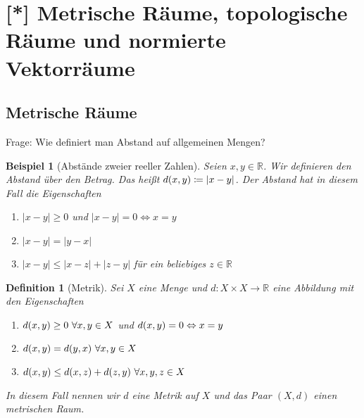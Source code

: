 \documentclass[11pt, twoside, a4paper]{article}
\theoremstyle{plain}
\newtheorem{definition}[blockelement]{Definition}
\newtheorem{beispiel}[blockelement]{Beispiel}
\numberwithin{equation}{subsection}
\newcommand{\pair}[1]{\left(#1\right)}
\newcommand{\of}[1]{\mathopen{}\mathclose{}\bgroup\left(#1\aftergroup\egroup\right)}
\newcommand{\abs}[1]{\left\lvert#1\right\rvert}
\newcommand{\equivalent}[0]{\Leftrightarrow{}}
\newcommand{\fromto}{\rightarrow{}}
\newcommand{\R}{\mathbb{R}}
\begin{document}
    \newpage


    \section{[*] Metrische Räume, topologische Räume und normierte Vektorräume}

    \subsection{Metrische Räume}
    \thispagestyle{pagenumberonly}

    \marginnote{[07. Jun]}
    Frage: Wie definiert man Abstand auf allgemeinen Mengen?

    \begin{beispiel}[Abstände zweier reeller Zahlen]
        Seien $x,y\in\R$. Wir definieren den Abstand über den Betrag. Das heißt $d\of{x,y}\coloneqq \abs{x-y}$.
        Der Abstand hat in diesem Fall die Eigenschaften
        \begin{enumerate}[label=(\roman*)]
            \item $\abs{x-y} \geq 0$ und $\abs{x-y} = 0 \equivalent x=y$
            \item $\abs{x-y} = \abs{y-x}$
            \item $\abs{x-y} \leq \abs{x-z} + \abs{z-y}$ für ein beliebiges $z\in\R$
        \end{enumerate}
    \end{beispiel}

    \begin{definition}[Metrik]
        Sei $X$ eine Menge und $d: X \times X\fromto \R$ eine Abbildung mit den Eigenschaften
        \begin{enumerate}[label=(\roman*)]
            \item $d\of{x,y} \geq 0~\forall x,y\in X$ und $d\of{x,y} = 0\equivalent x = y$
            \item $d\of{x,y} = d\of{y,x}~\forall x,y\in X$
            \item $d\of{x,y} \leq d\of{x,z} + d\of{z,y}~\forall x,y,z\in X$
        \end{enumerate}
        In diesem Fall nennen wir $d$ eine Metrik auf $X$ und das Paar $\pair{X, d}$ einen metrischen Raum.
    \end{definition}
\end{document}
